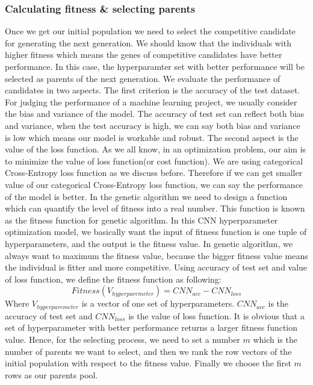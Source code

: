 \documentclass[12pt]{article}
\begin{document}
\subsubsection{Calculating fitness \& selecting parents}
Once we get our initial population we need to select the competitive candidate for generating the next generation. We should know that the individuals with higher fitness which means the genes of competitive candidates have better performance. In this case, the hyperparamter set with better performance will be selected as parents of the next generation. We evaluate the performance of candidates in two aspects. The first criterion is the accuracy of the test dataset. For judging the performance of a machine learning project, we usually consider the bias and variance of the model. The accuracy of test set can reflect both bias and variance, when the test accuracy is high, we can say both bias and variance is low which means our model is workable and robust. The second aspect is the value of the loss function. As we all know, in an optimization problem, our aim is to minimize the value of loss function(or cost function). We are using  categorical Cross-Entropy loss function as we discuss before. Therefore if we can get smaller value of our categorical Cross-Entropy loss function, we can say the performance of the model is better. In the genetic algorithm we need to design a function which can quantify the level of fitness into a real number. This function is known as the fitness function for genetic algorithm. In this CNN hyperparameter optimization model, we basically want the input of fitness function is one tuple of hyperparameters, and the output is the fitness value. In genetic algorithm, we always want to maximum the fitness value, because the bigger fitness value means the individual is fitter and more competitive. Using accuracy of test set and value of loss function, we define the fitness function as following:
$$Fitness(V_{hyperparemeter}) =  CNN_{acc} - CNN_{loss}$$
Where $V_{hyperparemeter}$ is a vector of one set of hyperparameters.  $CNN_{acc}$ is the accuracy of test set and $ CNN_{loss}$ is the value of loss function. It is obvious that a set of hyperparameter with better performance returns a larger fitness function value. Hence, for the selecting process, we need to set a number $m$ which is the number of parents we want to select, and then we rank the row vectors of the initial population with respect to the fitness value. Finally we choose the first $m$ rows as our parents pool.\\
~\\
\end{document}
